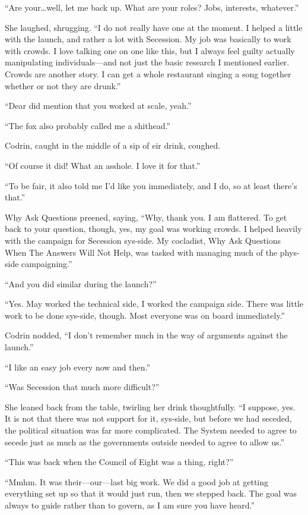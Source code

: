 ``Are your\ldots well, let me back up. What are your roles? Jobs, interests, whatever.''

She laughed, shrugging. ``I do not really have one at the moment. I helped a little with the launch, and rather a lot with Secession. My job was basically to work with crowds. I love talking one on one like this, but I always feel guilty actually manipulating individuals---and not just the basic research I mentioned earlier. Crowds are another story. I can get a whole restaurant singing a song together whether or not they are drunk.''

``Dear did mention that you worked at scale, yeah.''

``The fox also probably called me a shithead.''

Codrin, caught in the middle of a sip of eir drink, coughed.

``Of course it did! What an asshole. I love it for that.''

``To be fair, it also told me I'd like you immediately, and I do, so at least there's that.''

Why Ask Questions preened, saying, ``Why, thank you. I am flattered. To get back to your question, though, yes, my goal was working crowds. I helped heavily with the campaign for Secession sys-side. My cocladist, Why Ask Questions When The Answers Will Not Help, was tasked with managing much of the phys-side campaigning.''

``And you did similar during the launch?''

``Yes. May worked the technical side, I worked the campaign side. There was little work to be done sys-side, though. Most everyone was on board immediately.''

Codrin nodded, ``I don't remember much in the way of arguments against the launch.''

``I like an easy job every now and then.''

``Was Secession that much more difficult?''

She leaned back from the table, twirling her drink thoughtfully. ``I suppose, yes. It is not that there was not support for it, sys-side, but before we had seceded, the political situation was far more complicated. The System needed to agree to secede just as much as the governments outside needed to agree to allow us.''

``This was back when the Council of Eight was a thing, right?''

``Mmhm. It was their---our---last big work. We did a good job at getting everything set up so that it would just run, then we stepped back. The goal was always to guide rather than to govern, as I am sure you have heard.''


